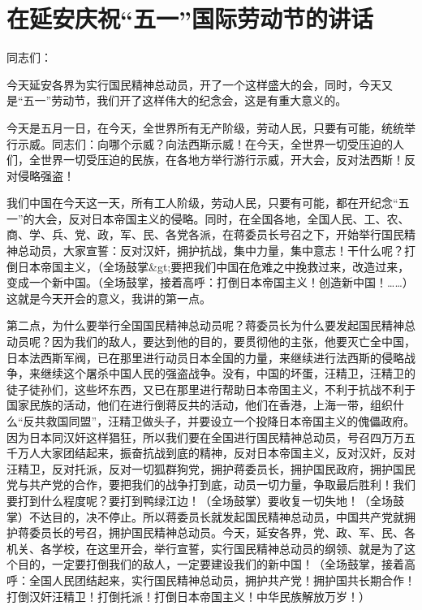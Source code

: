 \section[在延安庆祝“五一”国际劳动节的讲话（一九三九年五月一日）]{在延安庆祝“五一”国际劳动节的讲话}


同志们：

今天延安各界为实行国民精神总动员，开了一个这样盛大的会，同时，今天又是“五一”劳动节，我们开了这样伟大的纪念会，这是有重大意义的。

今天是五月一日，在今天，全世界所有无产阶级，劳动人民，只要有可能，统统举行示威。同志们：向哪个示威？向法西斯示威！在今天，全世界一切受压迫的人们，全世界一切受压迫的民族，在各地方举行游行示威，开大会，反对法西斯！反对侵略强盗！

我们中国在今天这一天，所有工人阶级，劳动人民，只要有可能，都在开纪念“五一”的大会，反对日本帝国主义的侵略。同时，在全国各地，全国人民、工、农、商、学、兵、党、政，军、民、各党各派，在蒋委员长号召之下，开始举行国民精神总动员，大家宣誓：反对汉奸，拥护抗战，集中力量，集中意志！干什么呢？打倒日本帝国主义，（全场鼓掌&gt;要把我们中国在危难之中挽救过来，改造过来，变成一个新中国。（全场鼓掌，接着高呼：打倒日本帝国主义！创造新中国！……）这就是今天开会的意义，我讲的第一点。

第二点，为什么要举行全国国民精神总动员呢？蒋委员长为什么要发起国民精神总动员呢？因为我们的敌人，要达到他的目的，要贯彻他的主张，他要灭亡全中国，日本法西斯军阀，已在那里进行动员日本全国的力量，来继续进行法西斯的侵略战争，来继续这个屠杀中国人民的强盗战争。没有，中国的坏蛋，汪精卫，汪精卫的徒子徒孙们，这些坏东西，又已在那里进行帮助日本帝国主义，不利于抗战不利于国家民族的活动，他们在进行倒蒋反共的活动，他们在香港，上海一带，组织什么“反共救国同盟”，汪精卫做头子，并要设立一个投降日本帝国主义的傀儡政府。因为日本同汉奸这样猖狂，所以我们要在全国进行国民精神总动员，号召四万万五千万人大家团结起来，振奋抗战到底的精神，反对日本帝国主义，反对汉奸，反对汪精卫，反对托派，反对一切狐群狗党，拥护蒋委员长，拥护国民政府，拥护国民党与共产党的合作，要把我们的战争打到底，动员一切力量，争取最后胜利！我们要打到什么程度呢？要打到鸭绿江边！（全场鼓掌）要收复一切失地！（全场鼓掌）不达目的，决不停止。所以蒋委员长就发起国民精神总动员，中国共产党就拥护蒋委员长的号召，拥护国民精神总动员。今天，延安各界，党、政、军、民、各机关、各学校，在这里开会，举行宣誓，实行国民精神总动员的纲领、就是为了这个目的，一定要打倒我们的敌人，一定要建设我们的新中国！（全场鼓掌，接着高呼：全国人民团结起来，实行国民精神总动员，拥护共产党！拥护国共长期合作！打倒汉奸汪精卫！打倒托派！打倒日本帝国主义！中华民族解放万岁！）

